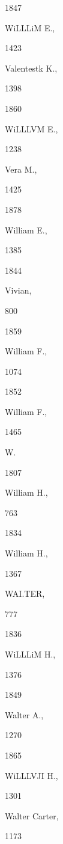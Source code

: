 {{{1847 


WiLLLiM E., 


1423 




Valentestk K., 


1398 


1860 


WiLLLVM E., 


1238 




Vera M., 


1425 


1878 


William E., 


1385 


1844 


Vivian, 


800 


1859 


William F., 


1074 








1852 


William F., 


1465 




W. 




1807 


William H., 


763 








1834 


William H., 


1367 




WAI.TER, 


777 


1836 


WiLLLiM H., 


1376 


1849 


Walter A., 


1270 


1865 


WiLLLVJI H., 


1301 




Walter Carter, 


1173 


}}}
